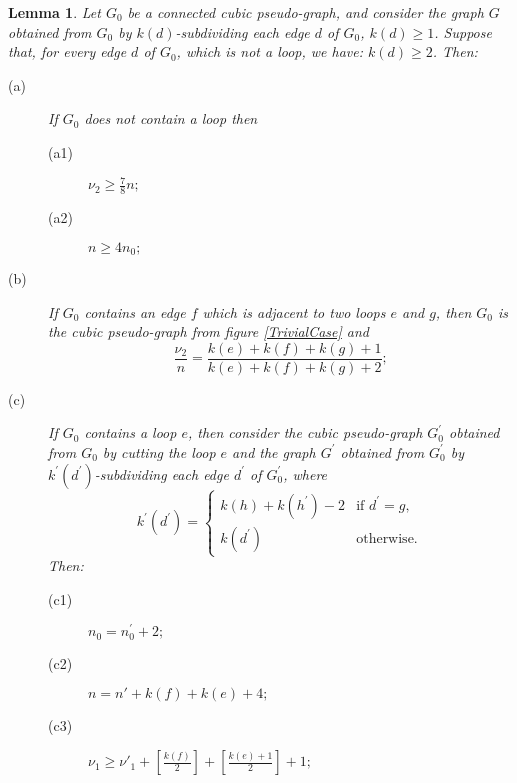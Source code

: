 \documentclass[fleqn,12pt,twoside]{article}
\newtheorem{lemma}{Lemma}
\begin{document}
\begin{lemma}
\label{PseudoGraphSubdivision} Let $G_{0}$ be a connected cubic
pseudo-graph, and consider the graph $G$ obtained from $G_{0}$ by $k(d)$-subdividing each edge $d$ of $G_{0}$, $k(d)\geq 1$. Suppose that,
for every edge $d$ of $G_{0}$, which is not a loop, we have:
$k(d)\geq 2$. Then:

\begin{description}
\item[(a)] If $G_{0}$ does not contain a loop then

\begin{description}
\item[(a1)] $\nu _{2}\geq \frac{7}{8}n ;$

\item[(a2)] $n \geq 4n_{0}
;$
\end{description}

\item[(b)] If $G_{0}$ contains an edge $f$ which is adjacent to two loops $e$
and $g$, then $G_{0}$ is the cubic pseudo-graph from figure
\ref{TrivialCase} and\begin{equation*}
\frac{\nu _{2}}{n }=\frac{k(e)+k(f)+k(g)+1}{k(e)+k(f)+k(g)+2}\text{;}
\end{equation*}

\item[(c)] If $G_{0}$ contains a loop $e$, then consider the cubic
pseudo-graph $G_{0}^{\prime }$ obtained from $G_{0}$ by cutting the
loop $e$ and the graph $G^{\prime }$ obtained from $G_{0}^{\prime }$
by $k^{\prime }(d^{\prime })$-subdividing each edge $d^{\prime }$ of
$G_{0}^{\prime }$, where
\begin{equation}
k^{\prime }(d^{\prime })=\left\{
\begin{array}{ll}
k(h)+k(h^{\prime })-2 & \text{if }d^{\prime }=g\text{,} \\
k(d^{\prime }) & \text{otherwise.}\end{array}\right.  \label{KPrimeDefinition}
\end{equation}Then:

\begin{description}
\item[(c1)] $n_0 =n_{0}^{\prime}+2;$

\item[(c2)] $n =n'+k(f)+k(e)+4;$

\item[(c3)] $\nu _{1}\geq \nu' _{1}+\left[ \frac{k(f)}{2}\right] +\left[ \frac{k(e)+1}{2}\right] +1;$


\end{description}
\end{description}
\end{lemma}
\end{document}
